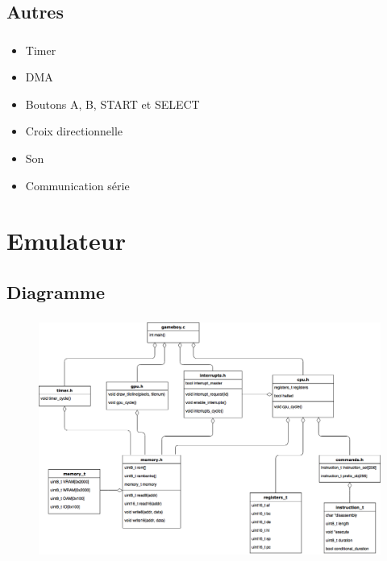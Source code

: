 \documentclass{beamer}
\begin{document}

\subsection{Autres}
\begin{frame}
	\frametitle{\secname}
  \framesubtitle{\subsecname}
  \begin{itemize}
    \item Timer
    \item DMA
    \item Boutons A, B, START et SELECT
    \item Croix directionnelle
    \item Son
    \item Communication série
  \end{itemize}
\end{frame}


\section{Emulateur}
\subsection{Diagramme}
\begin{frame}
	\frametitle{\secname}
  \framesubtitle{\subsecname}
  \begin{center}
    \begin{figure}
      \includegraphics[width=.50\textwidth]{images/class_diag.png}
    \end{figure}
  \end{center}
\end{frame}

\end{document}
